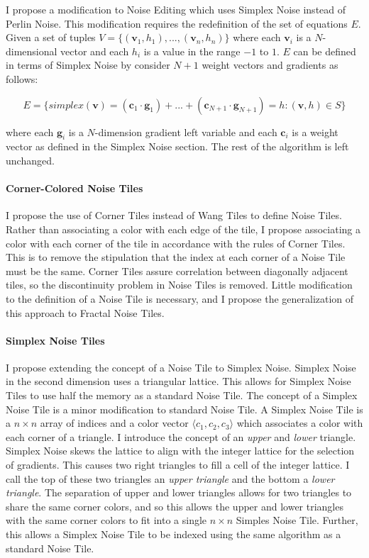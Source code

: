 \documentclass[12pt]{article}
\theoremstyle{definition}
\theoremstyle{remark}
\begin{document}
I propose a modification to Noise Editing which uses Simplex Noise instead of Perlin Noise. This modification requires the redefinition of the set of equations $E$. Given a set of tuples $V = \{ (\textbf{v}_1, h_1), ..., (\textbf{v}_n, h_n) \}$ where each $\textbf{v}_i$ is a $N$-dimensional vector and each $h_i$ is a value in the range $-1$ to $1$. $E$ can be defined in terms of Simplex Noise by consider $N+1$ weight vectors and gradients as follows:

\begin{equation*}
E = \{ simplex(\textbf{v}) = (\textbf{c}_1 \cdot \textbf{g}_1) + ... + (\textbf{c}_{N+1} \cdot \textbf{g}_{N+1}) = h : (\textbf{v}, h) \in S \}
\end{equation*}

where each $\textbf{g}_i$ is a $N$-dimension gradient left variable and each $\textbf{c}_i$ is a weight vector as defined in the Simplex Noise section. The rest of the algorithm is left unchanged.

\paragraph{Corner-Colored Noise Tiles}

I propose the use of Corner Tiles instead of Wang Tiles to define Noise Tiles. Rather than associating a color with each edge of the tile, I propose associating a color with each corner of the tile in accordance with the rules of Corner Tiles. This is to remove the stipulation that the index at each corner of a Noise Tile must be the same. Corner Tiles assure correlation between diagonally adjacent tiles, so the discontinuity problem in Noise Tiles is removed. Little modification to the definition of a Noise Tile is necessary, and I propose the generalization of this approach to Fractal Noise Tiles.

\paragraph{Simplex Noise Tiles}

I propose extending the concept of a Noise Tile to Simplex Noise. Simplex Noise in the second dimension uses a triangular lattice. This allows for Simplex Noise Tiles to use half the memory as a standard Noise Tile. The concept of a Simplex Noise Tile is a minor modification to standard Noise Tile. A Simplex Noise Tile is a $n \times n$ array of indices and a color vector $\langle c_1, c_2, c_3 \rangle$ which associates a color with each corner of a triangle. I introduce the concept of an \textit{upper} and \textit{lower} triangle. Simplex Noise skews the lattice to align with the integer lattice for the selection of gradients. This causes two right triangles to fill a cell of the integer lattice. I call the top of these two triangles an \textit{upper triangle} and the bottom a \textit{lower triangle}. The separation of upper and lower triangles allows for two triangles to share the same corner colors, and so this allows the upper and lower triangles with the same corner colors to fit into a single $n \times n$ Simples Noise Tile. Further, this allows a Simplex Noise Tile to be indexed using the same algorithm as a standard Noise Tile.
\end{document}
